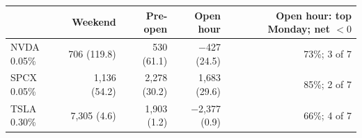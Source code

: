 \begin{tabular}{lrrrr}
\toprule
 & Weekend & Pre-open & Open hour & Open hour: top Monday; net $<0$ \\
\midrule
NVDA 0.05\% & 706 (119.8) & 530 (61.1) & $-$427 (24.5) & 73\%; 3 of 7 \\
SPCX 0.05\% & 1,136 (54.2) & 2,278 (30.2) & 1,683 (29.6) & 85\%; 2 of 7 \\
TSLA 0.30\% & 7,305 (4.6) & 1,903 (1.2) & $-$2,377 (0.9) & 66\%; 4 of 7 \\
\bottomrule
\end{tabular}
